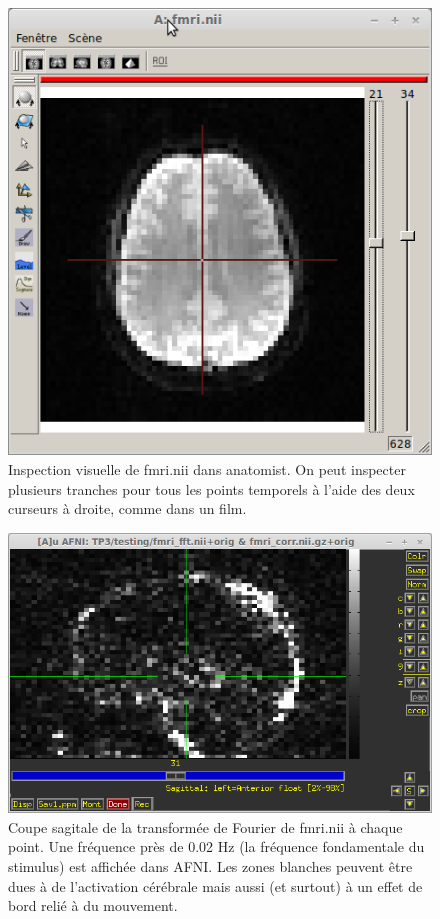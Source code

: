 \documentclass[a4paper]{article}
\begin{document}
\begin{figure}[h]
   \centering
   \includegraphics[width=\textwidth]{fmri_anatomist}
   \caption{\label{fmri_anatomist} Inspection visuelle de fmri.nii dans anatomist. On peut inspecter plusieurs tranches pour tous les points temporels à l'aide des deux curseurs à droite, comme dans un film.}
\end{figure}

\begin{figure}[h]
   \centering
   \includegraphics[width=\textwidth]{fmri_fft}
   \caption{\label{fmri_fft} Coupe sagitale de la transformée de Fourier de fmri.nii à chaque point. Une fréquence près de 0.02 Hz (la fréquence fondamentale du stimulus) est affichée dans AFNI. Les zones blanches peuvent être dues à de l'activation cérébrale mais aussi (et surtout) à un effet de bord relié à du mouvement.}
\end{figure}
\end{document}
